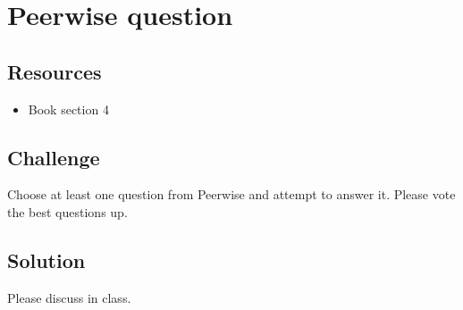 \newpage
\section{Peerwise question}

\subsection*{Resources}
\begin{itemize}
    \item Book section 4
\end{itemize}

\subsection*{Challenge}
Choose at least one question from Peerwise and attempt to answer it.
Please vote the best questions up.

\subsection*{Solution}
Please discuss in class.
\fi
